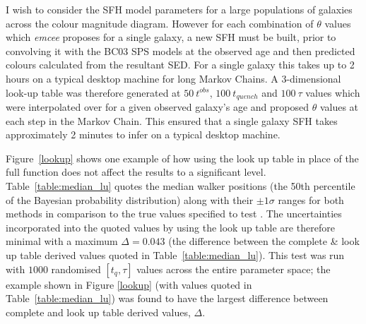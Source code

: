 \begin{table}
\end{table}

I wish to consider the SFH model parameters for a large populations of galaxies across the colour magnitude diagram. However for each combination of $\theta$ values which \emph{emcee} proposes for a single galaxy, a new SFH must be built, prior to convolving it with the BC03 SPS models at the observed age and then predicted colours calculated from the resultant SED. For a single galaxy this takes up to 2 hours on a typical desktop machine for long Markov Chains. A 3-dimensional look-up table was therefore generated at $50 ~t^{obs}$, $100 ~t_{quench}$ and $100 ~\tau$ values which were interpolated over for a given observed galaxy's age and proposed $\theta$ values at each step in the Markov Chain. This ensured that a single galaxy SFH takes approximately 2 minutes to infer on a typical desktop machine. 

Figure~\ref{lookup} shows one example of how using the look up table in place of the full function does not affect the results to a significant level. Table~\ref{table:median_lu} quotes the median walker positions (the 50th percentile of the Bayesian probability distribution) along with their $\pm 1\sigma$ ranges for both methods in comparison to the true values specified to test \starpy. The uncertainties incorporated into the quoted values by using the look up table are therefore minimal with a maximum $\Delta = 0.043$ (the difference between the complete \& look up table derived values quoted in Table~\ref{table:median_lu}). This test was run with $1000$ randomised $[t_q, \tau]$ values across the entire parameter space; the example shown in Figure \ref{lookup} (with values quoted in Table~\ref{table:median_lu}) was found to have the largest difference between complete and look up table derived values, $\Delta$. 

